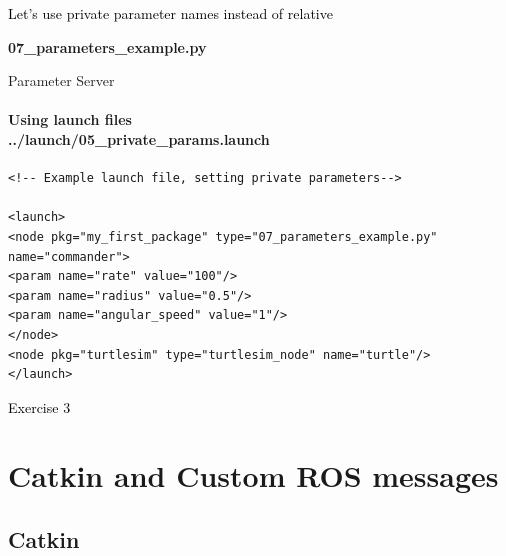 \documentclass{beamer}
\begin{document}
\begin{frame}[plain]{}  
    \centering
\textcolor{black}{Let's use private parameter names instead of relative}
            
           \huge{  \textbf{07\_parameters\_example.py}}
\end{frame}




\begin{frame}[fragile]{Parameter Server}
    \framesubtitle{Using launch files\\
        \vspace{0.2cm}
        ../launch/05\_private\_params.launch
    }
    \begin{lstlisting}
<!-- Example launch file, setting private parameters-->

<launch>
<node pkg="my_first_package" type="07_parameters_example.py" name="commander">
<param name="rate" value="100"/>
<param name="radius" value="0.5"/>
<param name="angular_speed" value="1"/>
</node>
<node pkg="turtlesim" type="turtlesim_node" name="turtle"/>
</launch>
    \end{lstlisting}  
\end{frame}



\begin{frame}[plain]{}  
    \centering
    {\huge \textcolor{black}{Exercise 3}}
\end{frame}





\section{Catkin and Custom ROS messages}



\subsection{Catkin}
\end{document}
